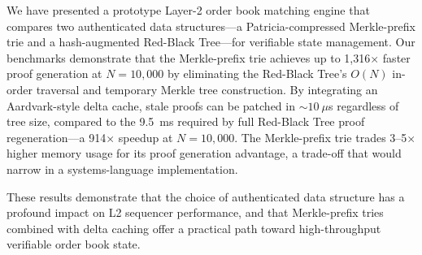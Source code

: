 \documentclass[letterpaper,twocolumn,10pt]{article}
\begin{document}
We have presented a prototype Layer-2 order book matching engine that compares two authenticated data structures---a Patricia-compressed Merkle-prefix trie and a hash-augmented Red-Black Tree---for verifiable state management.
Our benchmarks demonstrate that the Merkle-prefix trie achieves up to 1{,}316$\times$ faster proof generation at $N = 10{,}000$ by eliminating the Red-Black Tree's $O(N)$ in-order traversal and temporary Merkle tree construction.
By integrating an Aardvark-style delta cache, stale proofs can be patched in ${\sim}10~\mu$s regardless of tree size, compared to the 9.5~ms required by full Red-Black Tree proof regeneration---a 914$\times$ speedup at $N = 10{,}000$.
The Merkle-prefix trie trades 3--5$\times$ higher memory usage for its proof generation advantage, a trade-off that would narrow in a systems-language implementation.

These results demonstrate that the choice of authenticated data structure has a profound impact on L2 sequencer performance, and that Merkle-prefix tries combined with delta caching offer a practical path toward high-throughput verifiable order book state.


{\footnotesize


}
\end{document}
